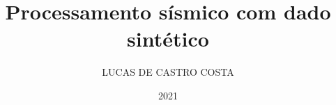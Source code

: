 \documentclass[G]{cpgf}
\begin{document}
\title{Processamento sísmico com dado sintético}
\author{LUCAS DE CASTRO COSTA} %
\date{2021}







\capa %

% 



% 


\tableofcontents        




%
%
%
%
% 


 


%

%
\end{document}
